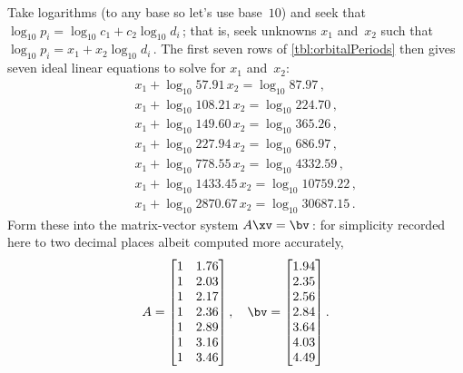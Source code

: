 \begin{example}
\begin{solution}
Take logarithms (to any base so let's use base~\(10\)) and seek that 
\(\log_{10}p_i=\log_{10} c_1+c_2\log_{10}d_i\)\,; that is, seek unknowns \(x_1\) and~\(x_2\) such that \(\log_{10}p_i=x_1+x_2\log_{10}d_i\)\,.
The first seven rows of \autoref{tbl:orbitalPeriods} then gives seven ideal linear equations to solve for \(x_1\) and~\(x_2\):
\begin{eqnarray*}
&&x_1+\log_{10}57.91\,x_2=\log_{10}87.97\,, %
\\&&x_1+\log_{10}108.21\,x_2=\log_{10}224.70\,, %
\\&&x_1+\log_{10}149.60\,x_2=\log_{10}365.26\,, %
\\&&x_1+\log_{10}227.94\,x_2=\log_{10}686.97\,, %
\\&&x_1+\log_{10}778.55\,x_2=\log_{10}4332.59\,, %
\\&&x_1+\log_{10}1433.45\,x_2=\log_{10}10759.22\,, %
\\&&x_1+\log_{10}2870.67\,x_2=\log_{10}30687.15\,. %
\end{eqnarray*}
Form these into the matrix-vector system \(A\xv=\bv\)\,:
for simplicity recorded here to two decimal places albeit computed more accurately,
\begin{equation*}
A= \begin{bmatrix}   1&1.76\\
   1&2.03\\
   1&2.17\\
   1&2.36\\
   1&2.89\\
   1&3.16\\
   1&3.46
 \end{bmatrix},
\quad \bv=\begin{bmatrix}   1.94\\
   2.35\\
   2.56\\
   2.84\\
   3.64\\
   4.03\\
   4.49
\end{bmatrix}.
\end{equation*}


\end{solution}
\end{example}

